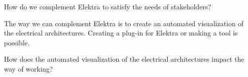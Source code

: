 \vspace{1em}
\vspace{2em}

\begin{que}
How do we complement Elektra to satisfy the needs of stakeholders?
\end{que}

\vspace{1em}
The way we can complement Elektra is to create an automated visualization of the electrical architectures. Creating a plug-in for Elektra or making a tool is possible. 
\vspace{2em}


\begin{que}
How does the automated visualization of the electrical architectures impact the way of working?
\end{que}

\vspace{1em}
\vspace{2em}
